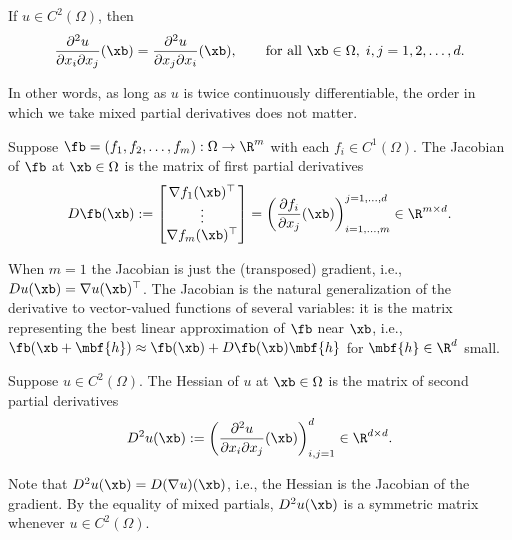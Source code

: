 \begin{lemma}
    \label{lem:mixed-partials}
    If $u \in C^2(\Omega)$, then
    \begin{equation*}
        \frac{\partial^2 u}{\partial x_i \partial x_j}(\xb) =
        \frac{\partial^2 u}{\partial x_j \partial x_i}(\xb),
        \qquad \text{for all } \xb \in \Omega, \; i,j = 1,2,\ldots,d.
    \end{equation*}
\end{lemma}
In other words, as long as $u$ is twice continuously differentiable, the
order in which we take mixed partial derivatives does not matter.

\begin{definition}[Jacobian]
    Suppose $\fb = (f_1, f_2, \ldots, f_m): \Omega \to \R^m$ with each
    $f_i \in C^1(\Omega)$. The Jacobian of $\fb$ at $\xb \in \Omega$ is
    the matrix of first partial derivatives
    \begin{equation*}
        D\fb(\xb) :=
        \begin{bmatrix}
            \nabla f_1(\xb)^\top \\
            \vdots \\
            \nabla f_m(\xb)^\top
        \end{bmatrix}
        =
        \left(
            \frac{\partial f_i}{\partial x_j}(\xb)
        \right)_{i=1,\ldots,m}^{j=1,\ldots,d}
        \in \R^{m \times d}.
    \end{equation*}
\end{definition}
When $m=1$ the Jacobian is just the (transposed) gradient, i.e.,
$Du(\xb) = \nabla u(\xb)^\top$. The Jacobian is the natural
generalization of the derivative to vector-valued functions of several
variables: it is the matrix representing the best linear approximation
of $\fb$ near $\xb$, i.e., $\fb(\xb + \mbf{h}) \approx \fb(\xb) +
D\fb(\xb) \mbf{h}$ for $\mbf{h} \in \R^d$ small.

\begin{definition}[Hessian]
    Suppose $u \in C^2(\Omega)$. The Hessian of $u$ at $\xb \in \Omega$
    is the matrix of second partial derivatives
    \begin{equation*}
        D^2 u(\xb) :=
        \left(
            \frac{\partial^2 u}{\partial x_i \partial x_j}(\xb)
        \right)_{i,j=1}^d \in \R^{d \times d}.
    \end{equation*}
\end{definition}
Note that $D^2 u(\xb) = D(\nabla u)(\xb)$, i.e., the Hessian is the
Jacobian of the gradient. By the equality of mixed partials, $D^2
u(\xb)$ is a symmetric matrix whenever $u \in C^2(\Omega)$.

